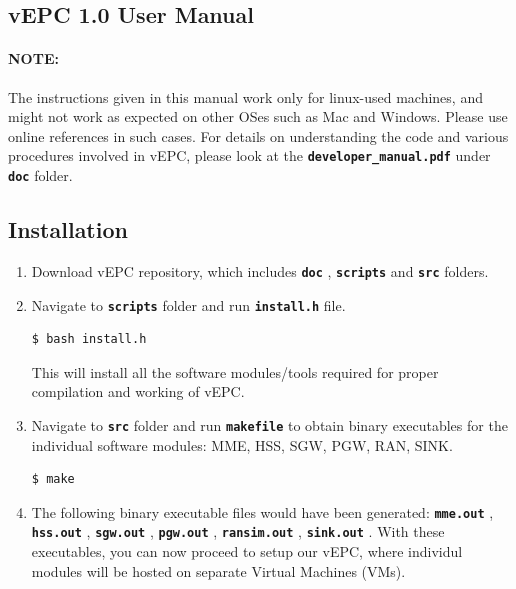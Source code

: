 \pdfminorversion=4\documentclass[hidelinks]{report}
\newcommand{\cf}[1] {
	\textbf{\texttt{#1}}
}
\begin{document}

\begin{center}
\section*{vEPC 1.0 User Manual}
\end{center}

\paragraph*{NOTE:}

The instructions given in this manual work only for linux-used machines, and might not work as expected on other OSes such as Mac and Windows. Please use online references in such cases. For details on understanding the code and various procedures involved in vEPC, please look at the \cf{developer\_manual.pdf} under \cf{doc} folder.

\subsection*{Installation}

\begin{enumerate}

\item Download vEPC repository, which includes \cf{doc}, \cf{scripts} and \cf{src} folders.

\item Navigate to \cf{scripts} folder and run \cf{install.h} file.

\begin{lstlisting}[language=bash]
$ bash install.h
\end{lstlisting}

This will install all the software modules/tools required for proper compilation and working of vEPC.

\item Navigate to \cf{src} folder and run \cf{makefile} to obtain binary executables for the individual software modules: MME, HSS, SGW, PGW, RAN, SINK.

\begin{lstlisting}[language=bash]
$ make
\end{lstlisting}

\item The following binary executable files would have been generated: \cf{mme.out}, \cf{hss.out}, \cf{sgw.out}, \cf{pgw.out}, \cf{ransim.out}, \cf{sink.out}. With these executables, you can now proceed to setup our vEPC, where individul modules will be hosted on separate Virtual Machines (VMs).

\end{enumerate}
\end{document}
